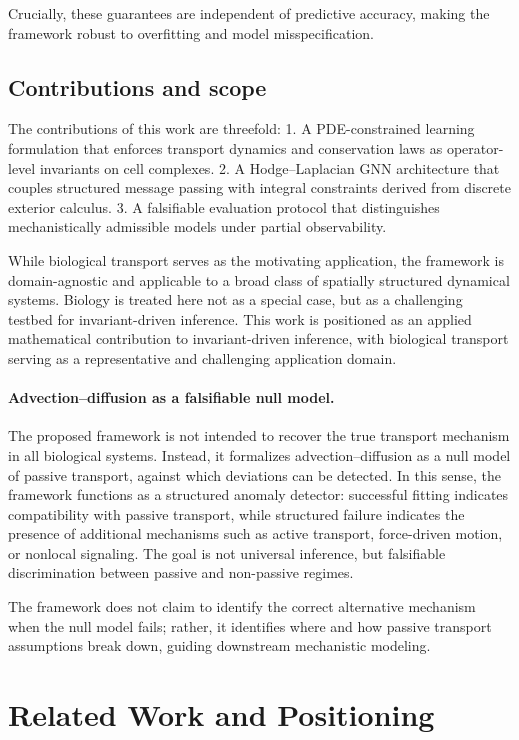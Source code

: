 \documentclass[10pt,article]{article}
\begin{document}
Crucially, these guarantees are independent of predictive accuracy, making the framework robust to overfitting and model misspecification.

\subsection{Contributions and scope}

The contributions of this work are threefold:
	1.	A PDE-constrained learning formulation that enforces transport dynamics and conservation laws as operator-level invariants on cell complexes.
	2.	A Hodge–Laplacian GNN architecture that couples structured message passing with integral constraints derived from discrete exterior calculus.
	3.	A falsifiable evaluation protocol that distinguishes mechanistically admissible models under partial observability.

While biological transport serves as the motivating application, the framework is domain-agnostic and applicable to a broad class of spatially structured dynamical systems. Biology is treated here not as a special case, but as a challenging testbed for invariant-driven inference.
This work is positioned as an applied mathematical contribution to invariant-driven inference, with biological transport serving as a representative and challenging application domain.

\paragraph{Advection--diffusion as a falsifiable null model.}
The proposed framework is not intended to recover the true transport mechanism in all biological systems. Instead, it formalizes advection--diffusion as a null model of passive transport, against which deviations can be detected. In this sense, the framework functions as a structured anomaly detector: successful fitting indicates compatibility with passive transport, while structured failure indicates the presence of additional mechanisms such as active transport, force-driven motion, or nonlocal signaling. The goal is not universal inference, but falsifiable discrimination between passive and non-passive regimes.

The framework does not claim to identify the correct alternative mechanism when the null model fails; rather, it identifies where and how passive transport assumptions break down, guiding downstream mechanistic modeling.
\section{Related Work and Positioning}
\end{document}
